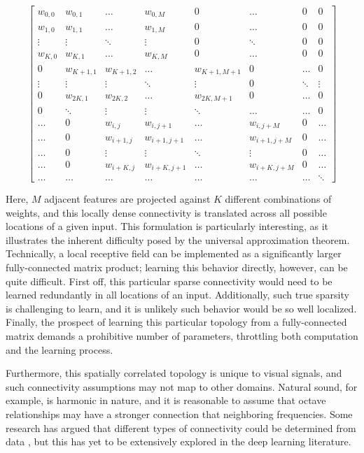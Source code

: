 \begingroup
\renewcommand*{\arraystretch}{0.8}
$$
\begin{bmatrix}
w_{0, 0} & w_{0, 1} & \dots  & w_{0, M} & 0 & \dots & 0 & 0 \\
w_{1, 0} & w_{1, 1} & \dots  & w_{1, M} & 0 & \dots & 0 & 0 \\
\vdots & \vdots & \ddots & \vdots & 0 & \ddots & 0 & 0 \\
w_{K, 0} & w_{K, 1} & \dots  & w_{K, M} & 0 & \dots & 0 & 0 \\
0 & w_{K + 1, 1} & w_{K + 1, 2} & \dots  & w_{K + 1, M + 1} & 0 & \dots & 0 \\
\vdots & \vdots & \vdots & \ddots & \vdots & 0 & \ddots & \vdots \\
0 & w_{2K, 1} & w_{2K, 2} & \dots  & w_{2K, M + 1} & 0 & \dots & 0 \\
0 & \ddots & \vdots & \vdots & \ddots & \dots & \dots & 0 \\
\dots & 0 & w_{i, j} & w_{i, j + 1} & \dots & w_{i, j + M} & 0 & \dots \\
\dots & 0 & w_{i + 1, j} & w_{i + 1, j + 1} & \dots & w_{i + 1, j + M} & 0  & \dots  \\
\dots & 0 & \vdots & \vdots & \ddots & \vdots & 0 & \dots \\
\dots & 0 & w_{i + K, j} & w_{i+K, j + 1} & \dots & w_{i + K, j + M} & 0  & \dots  \\
\dots & \dots & \dots & \dots & \dots & \dots & \dots & \ddots
\end{bmatrix}
$$
\endgroup

\noindent Here, $M$ adjacent features are projected against $K$ different combinations of weights, and this locally dense connectivity is translated across all possible locations of a given input.
This formulation is particularly interesting, as it illustrates the inherent difficulty posed by the universal approximation theorem.
Technically, a local receptive field can be implemented as a significantly larger fully-connected matrix product;
learning this behavior directly, however, can be quite difficult.
First off, this particular sparse connectivity would need to be learned redundantly in all locations of an input.
Additionally, such true sparsity is challenging to learn, and it is unlikely such behavior would be so well localized.
Finally, the prospect of learning this particular topology from a fully-connected matrix demands a prohibitive number of parameters, throttling both computation and the learning process.

Furthermore, this spatially correlated topology is unique to visual signals, and such connectivity assumptions may not map to other domains.
Natural sound, for example, is harmonic in nature, and it is reasonable to assume that octave relationships may have a stronger connection that neighboring frequencies.
Some research has argued that different types of connectivity could be determined from data \cite{Coates2012?}, but this has yet to be extensively explored in the deep learning literature.



